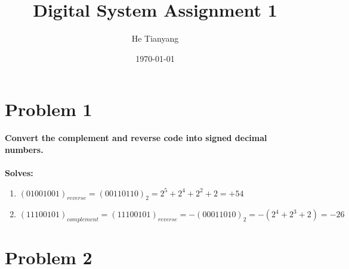 \documentclass{article}
\title{Digital System Assignment 1}
\author{He Tianyang}
\date{\today}
\begin{document}
\maketitle

\section*{Problem 1}
\textbf{Convert the complement and reverse code into signed decimal numbers.}\\
\\
\textbf{Solves:}

\begin{enumerate}
    \item $(01001001)_{reverse} = (00110110)_2 =2^5+2^4+2^2+2=\boxed{+54} $
    \item $(11100101)_{complement} = (11100101)_{reverse} = -(00011010)_2 = -(2^4+2^3+2)=\boxed{-26}$
\end{enumerate}

\section*{Problem 2}
\end{document}
